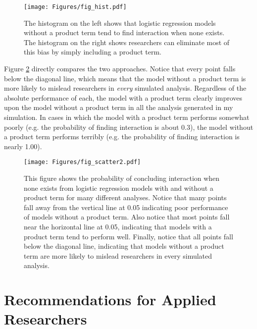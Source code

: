 \documentclass[12pt]{article}
\begin{document}
\begin{figure}[h]
\begin{center}
\texttt{[image: Figures/fig\_hist.pdf]}
\end{center}\caption{The histogram on the left shows that logistic regression models without a product term tend to find interaction when none exists. The histogram on the right shows researchers can eliminate most of this bias by simply including a product term.}\label{fig:hist}
\end{figure}



Figure \ref{fig:scatter} directly compares the two approaches. Notice that every point falls below the diagonal line, which means that the model without a product term is more likely to mislead researchers in \textit{every} simulated analysis. Regardless of the absolute performance of each, the model with a product term clearly improves upon the model without a product term in all the analysis generated in my simulation. In cases in which the model with a product term performs somewhat poorly (e.g. the probability of finding interaction is about 0.3), the model without a product term performs terribly (e.g. the probability of finding interaction is nearly 1.00).
 
\begin{figure}[H]
\begin{center}
\texttt{[image: Figures/fig\_scatter2.pdf]}
\end{center}\caption{This figure shows the probability of concluding interaction when none exists from logistic regression models with and without a product term for many different analyses. Notice that many points fall away from the vertical line at 0.05 indicating poor performance of models without a product term. Also notice that most points fall near the horizontal line at 0.05, indicating that models with a product term tend to perform well. Finally, notice that  all points fall below the diagonal line, indicating that models without a product term are more likely to mislead researchers in every simulated analysis.}\label{fig:scatter}
\end{figure}



\section*{Recommendations for Applied Researchers}
\end{document}
